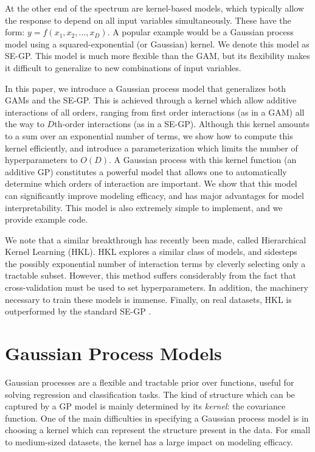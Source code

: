 At the other end of the spectrum are kernel-based models, which typically allow the response to depend on all input variables simultaneously.  These have the form: $y = f(x_1, x_2, \dots, x_D)$.  A popular example would be a Gaussian process model using a squared-exponential (or Gaussian) kernel.  We denote this model as SE-GP.  This model is much more flexible than the GAM, but its flexibility makes it difficult to generalize to new combinations of input variables. %

In this paper, we introduce a Gaussian process model that generalizes both GAMs and the SE-GP.  This is achieved through a kernel which allow additive interactions of all orders, ranging from first order interactions (as in a GAM) all the way to $D$th-order interactions (as in a SE-GP).  Although this kernel amounts to a sum over an exponential number of terms, we show how to compute this kernel efficiently, and introduce a parameterization which limits the number of hyperparameters to $O(D)$.  A Gaussian process with this kernel function (an additive GP) constitutes a powerful model that allows one to automatically determine which orders of interaction are important.  We show that this model can significantly improve modeling efficacy, and has major advantages for model interpretability.  This model is also extremely simple to implement, and we provide example code.

We note that a similar breakthrough has recently been made, called Hierarchical Kernel Learning (HKL)\cite{DBLP:journals/corr/abs-0909-0844}.  HKL explores a similar class of models, and sidesteps the possibly exponential number of interaction terms by cleverly selecting only a tractable subset.  However, this method suffers considerably from the fact that cross-validation must be used to set hyperparameters.  In addition, the machinery necessary to train these models is immense.  Finally, on real datasets, HKL is outperformed by the standard SE-GP \cite{DBLP:journals/corr/abs-0909-0844}.

\section{Gaussian Process Models}

Gaussian processes are a flexible and tractable prior over functions, useful for solving regression and classification tasks\cite{rasmussen38gaussian}.  The kind of structure which can be captured by a GP model is mainly determined by its \emph{kernel}: the covariance function.  One of the main difficulties in specifying a Gaussian process model is in choosing a kernel which can represent the structure present in the data.  For small to medium-sized datasets, the kernel has a large impact on modeling efficacy.
  

